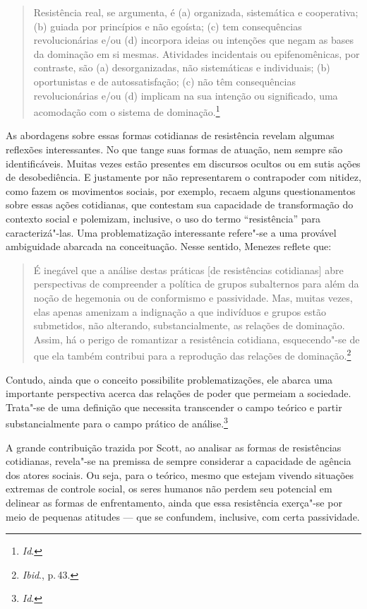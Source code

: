 \begin{quote}
Resistência real, se argumenta, é (a) organizada, sistemática e
cooperativa; (b) guiada por princípios e não egoísta; (c) tem
consequências revolucionárias e/ou (d) incorpora ideias ou intenções
que negam as bases da dominação em si mesmas. Atividades incidentais ou
epifenomênicas, por contraste, são (a) desorganizadas, não sistemáticas
e individuais; (b) oportunistas e de autossatisfação; (c) não têm
consequências revolucionárias e/ou (d) implicam na sua intenção ou
significado, uma acomodação com o sistema de dominação.\footnote{\textit{Id}.}
\end{quote}

As abordagens sobre essas formas cotidianas de resistência revelam
algumas reflexões interessantes. No que tange suas formas de atuação,
nem sempre são identificáveis. Muitas vezes estão presentes em discursos
ocultos ou em sutis ações de desobediência. E justamente por não
representarem o contrapoder com nitidez, como fazem os movimentos
sociais, por exemplo, recaem alguns questionamentos sobre essas ações
cotidianas, que contestam sua capacidade de transformação do contexto
social e polemizam, inclusive, o uso do termo ``resistência'' para
caracterizá"-las. Uma problematização interessante refere"-se a uma
provável ambiguidade abarcada na conceituação. Nesse sentido, Menezes
reflete que:

\begin{quote}
É inegável que a análise destas práticas {[}de resistências
cotidianas{]} abre perspectivas de compreender a política de grupos
subalternos para além da noção de hegemonia ou de conformismo e
passividade. Mas, muitas vezes, elas apenas amenizam a indignação a que
indivíduos e grupos estão submetidos, não alterando, substancialmente,
as relações de dominação. Assim, há o perigo de romantizar a resistência
cotidiana, esquecendo"-se de que ela também contribui para a reprodução
das relações de dominação.\footnote{\textit{Ibid}., p.\,43.}
\end{quote}

Contudo, ainda que o conceito possibilite problematizações, ele abarca
uma importante perspectiva acerca das relações de poder que permeiam a
sociedade. Trata"-se de uma definição que necessita transcender o campo
teórico e partir substancialmente para o campo prático de análise.\footnote{\textit{Id}.}

A grande contribuição trazida por Scott, ao analisar as formas de
resistências cotidianas, revela"-se na premissa de sempre considerar a
capacidade de agência dos atores sociais. Ou seja, para o teórico, mesmo
que estejam vivendo situações extremas de controle social, os seres
humanos não perdem seu potencial em delinear as formas de enfrentamento,
ainda que essa resistência exerça"-se por meio de pequenas atitudes ---
que se confundem, inclusive, com certa passividade.

